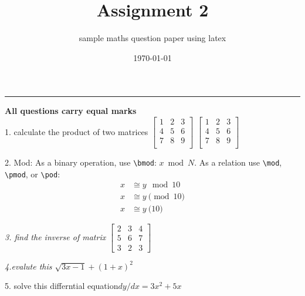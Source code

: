 \documentclass{article}
\title{Assignment 2}
\author{sample maths question paper using latex}
\date{\today}
\begin{document}
\maketitle
\hrule
\vspace{1cm}
\textbf{All questions carry equal marks }\\
\vspace{1cm}
1. calculate the product of two matrices
$
\begin{bmatrix}
1 & 2 & 3\\
4 & 5 & 6\\
7 & 8 & 9\\
\end{bmatrix}
$
$
\begin{bmatrix}
1 & 2 & 3\\
4 & 5 & 6\\
7 & 8 & 9\\
\end{bmatrix}
$
\vspace{1cm}

  2. Mod: As a binary operation, use \verb|\bmod|: $x \bmod N$. As a
  relation use \verb|\mod|, \verb|\pmod|, or \verb|\pod|: 
  \begin{align*}
    x &\cong y \mod 10 \\
    x &\cong y \pmod{10} \\
    x &\cong y \pod{10}
  \end{align*}


\vspace{1cm}   
  \emph{3. find the inverse of matrix}
  $ \begin{bmatrix}
2 & 3 & 4 \\
5 & 6 & 7 \\
3 & 2 & 3 
\end{bmatrix}  $
\vspace{1cm}

  \emph{4.evalute this $\sqrt{3x-1}+(1+x)^2$}
  
\vspace{1cm}
  5. solve this differntial equation$ dy/dx = 3x^2 + 5x$
\end{document}
